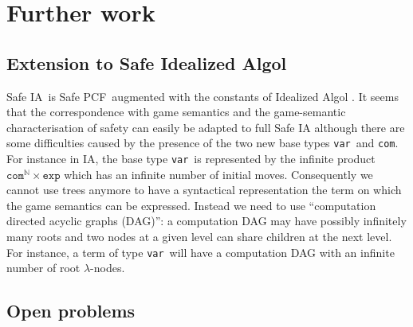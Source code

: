 \documentclass{llncs}
\newcommand\nat{\mathbb{N}}
\newcommand\ialgol{\textsf{IA}}
\newcommand\iacom{\texttt{com}}
\newcommand\iaexp{\texttt{exp}}
\newcommand\iavar{\texttt{var}}
\newcommand\pcf{\textsf{PCF}}
\begin{document}




\section{Further work}

\subsection{Extension to Safe Idealized Algol}

Safe \ialgol\ is Safe \pcf\ augmented with the constants of Idealized Algol
\cite{Reynolds81}. It seems that the correspondence with game semantics and the game-semantic characterisation
of safety can easily be adapted to full Safe \textsf{IA}
although there are some difficulties caused by the presence of the two new
base types \iavar\ and \iacom.
For instance in \ialgol, the base type \iavar\ is represented by the infinite product $\iacom^{\nat} \times \iaexp$ which has an infinite number of
initial moves. Consequently we cannot use trees anymore to have a syntactical representation the term on which the game semantics can be expressed.
Instead we need to use ``computation directed acyclic graphs (DAG)'': a computation DAG may
have possibly infinitely many roots and two nodes at a given level can share children at the next level. For instance, a term of type \iavar\ will have a computation DAG with an infinite number
of root $\lambda$-nodes. 

\subsection{Open problems}
\end{document}
